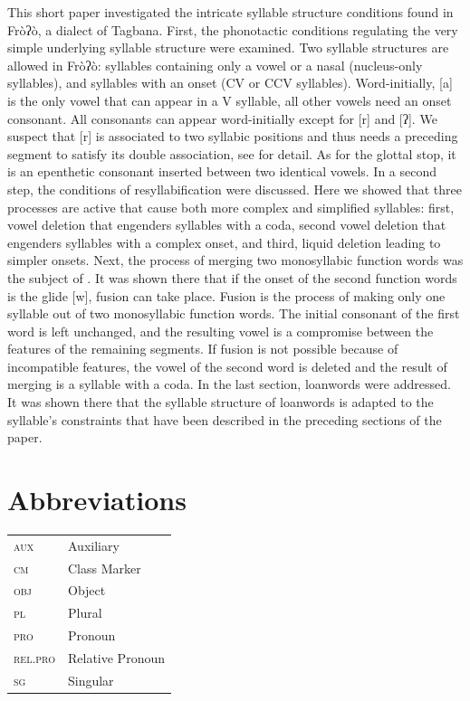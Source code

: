 \documentclass[output=paper]{langscibook}
\begin{document}
This short paper investigated the intricate syllable structure conditions found in Fròʔò, a dialect of Tagbana. First, the phonotactic conditions regulating the very simple underlying syllable structure were examined. Two syllable structures are allowed in Fròʔò: syllables containing only a vowel or a nasal (nucleus-only syllables), and syllables with an onset (CV or CCV syllables). Word-initially, [a] is the only vowel that can appear in a V syllable, all other vowels need an onset consonant. All consonants can appear word-initially except for [r] and [ʔ]. We suspect that [r] is associated to two syllabic positions and thus needs a preceding segment to satisfy its double association, see \cite{FanselowTBA} for detail. As for the glottal stop, it is an epenthetic consonant inserted between two identical vowels. In a second step, the conditions of resyllabification were discussed. Here we showed that three processes are active that cause both more complex and simplified syllables: first, vowel deletion that engenders syllables with a coda, second vowel deletion that engenders syllables with a complex onset, and third, liquid deletion leading to simpler onsets. Next, the process of merging two monosyllabic function words was the subject of . It was shown there that if the onset of the second function words is the glide [w], fusion can take place. Fusion is the process of making only one syllable out of two monosyllabic function words. The initial consonant of the first word is left unchanged, and the resulting vowel is a compromise between the features of the remaining segments. If fusion is not possible because of incompatible features, the vowel of the second word is deleted and the result of merging is a syllable with a coda. In the last section, loanwords were addressed. It was shown there that the syllable structure of loanwords is adapted to the syllable’s constraints that have been described in the preceding sections of the paper.  

\section{Abbreviations}
\noindent\begin{tabularx}{.8\textwidth}{@{}>{\scshape}lQ@{}}
aux & Auxiliary\\
cm & Class Marker\\
obj & Object\\
pl & Plural\\
pro & Pronoun\\
rel.pro & Relative Pronoun\\
sg & Singular\\
\end{tabularx}
\end{document}
